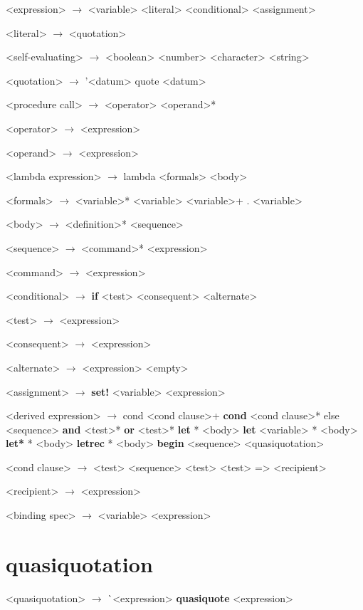 \documentclass[10pt]{report}
\begin{document}
\begin{grammar}
  <expression> $\longrightarrow$ <variable>
  \alt <literal>
  \alt <conditional>
  \alt <assignment>

  <literal> $\longrightarrow$ <quotation> 

  <self-evaluating> $\longrightarrow$ <boolean> \alt <number>
  \alt <character> \alt <string>

  <quotation> $\longrightarrow$ '<datum> \alt \bop quote <datum> \bcp

  <procedure call> $\longrightarrow$ \bop <operator> <operand>* \bcp

  <operator> $\longrightarrow$ <expression>

  <operand> $\longrightarrow$ <expression>

  <lambda expression> $\longrightarrow$ \bop lambda <formals> <body> \bcp

  <formals> $\longrightarrow$ \bop <variable>* \bcp \alt <variable>
  \alt \bop <variable>+  .  <variable> \bcp

  <body> $\longrightarrow$ <definition>* <sequence>

  <sequence> $\longrightarrow$ <command>* <expression>

  <command> $\longrightarrow$ <expression>

  <conditional> $\longrightarrow$ \bop \textbf{if} <test> <consequent> <alternate> \bcp

  <test> $\longrightarrow$ <expression>

  <consequent> $\longrightarrow$ <expression>

  <alternate> $\longrightarrow$ <expression> \alt <empty>

  <assignment> $\longrightarrow$ \bop \textbf{set!} <variable> <expression> \bcp

  <derived expression> $\longrightarrow$ \bop cond <cond clause>+ \bcp
  \alt \bop \textbf{cond} <cond clause>* \bop else <sequence> \bcp \bcp
  \alt \bop \textbf{and} <test>* \bcp
  \alt \bop \textbf{or} <test>* \bcp
  \alt \bop \textbf{let} * \bcp <body> \bcp
  \alt \bop \textbf{let} <variable> * \bcp <body> \bcp
  \alt \bop \textbf{let*} * \bcp <body> \bcp
  \alt \bop \textbf{letrec} * \bcp <body> \bcp
  \alt \bop \textbf{begin} <sequence> \bcp
  \alt <quasiquotation>

  <cond clause> $\longrightarrow$ \bop <test> <sequence> \bcp
  \alt \bop <test> \bcp
  \alt \bop <test> => <recipient> \bcp

  <recipient> $\longrightarrow$ <expression>


  <binding spec> $\longrightarrow$ \bop <variable> <expression> \bcp

\end{grammar}

\section{quasiquotation}
\begin{grammar}
  <quasiquotation> $\longrightarrow$ \`{}<expression>
  \alt \bop \textbf{quasiquote} <expression> \bcp
\end{grammar}
\end{document}
